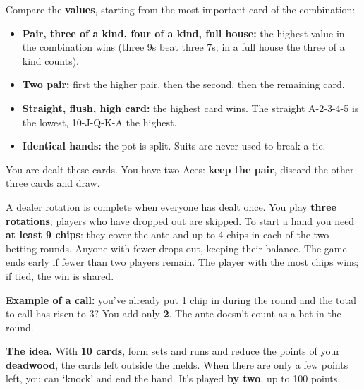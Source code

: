 \documentclass[10pt]{article}
\begin{document}
\startpage
{}
Compare the \textbf{values}, starting from the most important card of the combination:
\begin{itemize}
	\item \textbf{Pair, three of a kind, four of a kind, full house:} the highest value in the combination wins (three 9s beat three 7s; in a full house the three of a kind counts).
	\item \textbf{Two pair:} first the higher pair, then the second, then the remaining card.
	\item \textbf{Straight, flush, high card:} the highest card wins. The straight A-2-3-4-5 is the lowest, 10-J-Q-K-A the highest.
	\item \textbf{Identical hands:} the pot is split. Suits are never used to break a tie.
\end{itemize}
You are dealt these cards. You have two Aces: \textbf{keep the pair}, discard the other three cards and draw.
\begin{center}
\hfill
{}
\end{center}
A dealer rotation is complete when everyone has dealt once. You play \textbf{three rotations}; players who have dropped out are skipped. To start a hand you need \textbf{at least 9 chips}: they cover the ante and up to 4 chips in each of the two betting rounds. Anyone with fewer drops out, keeping their balance. The game ends early if fewer than two players remain. The player with the most chips wins; if tied, the win is shared.
\begin{callout}
\textbf{Example of a call:} you’ve already put 1 chip in during the round and the total to call has risen to 3? You add only \textbf{2}. The ante doesn’t count as a bet in the round.
\end{callout}
\vfill
{}

\startpage\label{gin}
\textbf{The idea.} With \textbf{10 cards}, form sets and runs and reduce the points of your \textbf{deadwood}, the cards left outside the melds. When there are only a few points left, you can ‘knock’ and end the hand. It’s played \textbf{by two}, up to 100 points.
\end{document}
